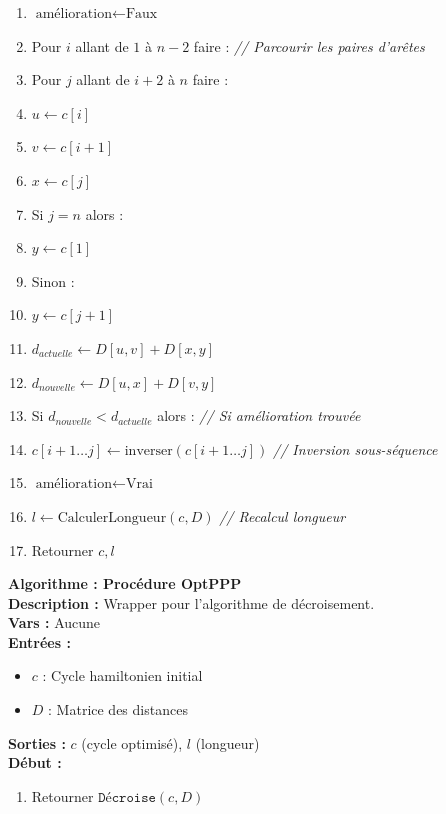 \documentclass[a4paper, 12pt]{article}
\begin{document}
\begin{tcolorbox}[colback=darkWhite!75!white,colframe=black!30,left=5pt,right=5pt,top=5pt,bottom=5pt]
\begin{enumerate}
    \item \quad $\text{amélioration} \leftarrow \text{Faux}$
    \item \quad Pour $i$ allant de $1$ à $n-2$ faire : \textit{// Parcourir les paires d'arêtes}
    \item \quad \quad Pour $j$ allant de $i+2$ à $n$ faire :
    \item \quad \quad \quad $u \leftarrow c[i]$
    \item \quad \quad \quad $v \leftarrow c[i+1]$
    \item \quad \quad \quad $x \leftarrow c[j]$
    \item \quad \quad \quad Si $j = n$ alors :
    \item \quad \quad \quad \quad $y \leftarrow c[1]$
    \item \quad \quad \quad Sinon :
    \item \quad \quad \quad \quad $y \leftarrow c[j+1]$
    \item \quad \quad \quad $d_{actuelle} \leftarrow D[u, v] + D[x, y]$
    \item \quad \quad \quad $d_{nouvelle} \leftarrow D[u, x] + D[v, y]$
    \item \quad \quad \quad Si $d_{nouvelle} < d_{actuelle}$ alors : \textit{// Si amélioration trouvée}
    \item \quad \quad \quad \quad $c[i+1 \dots j] \leftarrow \text{inverser}(c[i+1 \dots j])$ \textit{// Inversion sous-séquence}
    \item \quad \quad \quad \quad $\text{amélioration} \leftarrow \text{Vrai}$
    \item $l \leftarrow \text{CalculerLongueur}(c, D)$ \textit{// Recalcul longueur}
    \item Retourner $c, l$
\end{enumerate}
\end{tcolorbox}

\vspace{5mm}

\begin{tcolorbox}[colback=darkWhite!75!white,colframe=black!30,left=5pt,right=5pt,top=5pt,bottom=5pt]
\textbf{Algorithme : Procédure OptPPP} \\
\textbf{Description :} Wrapper pour l'algorithme de décroisement. \\
\textbf{Vars :} Aucune \\
\textbf{Entrées :}
\begin{itemize}
    \item $c$ : Cycle hamiltonien initial
    \item $D$ : Matrice des distances
\end{itemize}
\textbf{Sorties :} $c$ (cycle optimisé), $l$ (longueur) \\
\textbf{Début :}
\begin{enumerate}
    \item Retourner $\texttt{Décroise}(c, D)$
\end{enumerate}
\end{tcolorbox}
\end{document}
